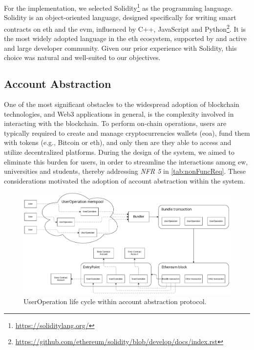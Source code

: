 For the implementation, we selected Solidity\footnote{\url{https://soliditylang.org/}} as the programming language. Solidity is an object-oriented language, designed specifically for writing smart contracts on \acrlong{eth} and the \acrshort{evm}, influenced by C++, JavaScript and Python\footnote{\url{https://github.com/ethereum/solidity/blob/develop/docs/index.rst}}. It is the most widely adopted language in the \acrlong{eth} ecosystem, supported by and active and large developer community. Given our prior experience with Solidity, this choice was natural and well-suited to our objectives.

\subsection{Account Abstraction}
\label{ssec:accountAbstraction}
One of the most significant obstacles to the widespread adoption of blockchain technologies, and Web3 applications in general, is the complexity involved in interacting with the blockchain. To perform on-chain operations, users are typically required to create and manage cryptocurrencies wallets (\acrfull{eoa}), fund them with tokens (e.g., Bitcoin or \acrlong{eth}), and only then are they able to access and utilize decentralized platforms. During the design of the system, we aimed to eliminate this burden for users, in order to streamline the interactions among \acrlong{ew}, universities and students, thereby addressing \textit{NFR 5} in \cref{tab:nonFuncReq}. These considerations motivated the adoption of account abstraction within the system.

\begin{figure}
  \centering
  \includegraphics[width=1\textwidth]{figures/Account Abstraction.pdf}
  \caption[UserOperation life cycle within account abstraction protocol]{UserOperation life cycle within account abstraction protocol.}
  \label{fig:accountAbstraction}
\end{figure}

